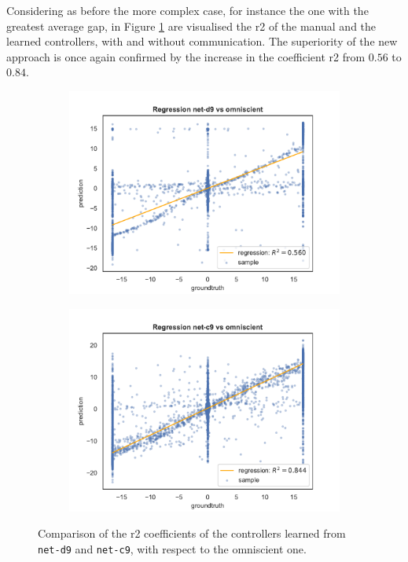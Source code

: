 Considering as before the more complex case, for instance the one with the 
greatest average gap, in Figure \ref{fig:net-c9r2} are visualised the \gls{r2} of the 
manual and the learned controllers, with and without communication.
The superiority of the new approach is once again confirmed by the increase in 
the coefficient \gls{r2} from $0.56$ to $0.84$. 
\begin{figure}[!htb]
	\begin{center}
		\begin{subfigure}[h]{0.49\textwidth}
			\includegraphics[width=\textwidth]{contents/images/net-d9/regression-net-d9-vs-omniscient}%
		\end{subfigure}
		\hfill\vspace{-0.5cm}
		\begin{subfigure}[h]{0.49\textwidth}
			\includegraphics[width=\textwidth]{contents/images/net-c9/regression-net-c9-vs-omniscient}%
		\end{subfigure}
	\end{center}
	\caption[Evaluation of the \gls{r2} coefficients of \texttt{net-c9}.]{Comparison 
		of the \gls{r2} coefficients of the controllers learned from 
		\texttt{net-d9} and \texttt{net-c9}, with respect to the omniscient one.}
	\label{fig:net-c9r2}
\end{figure}

